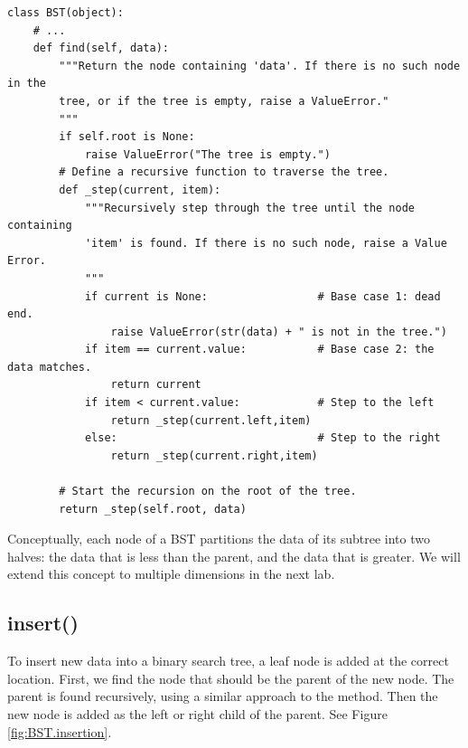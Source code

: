 \begin{lstlisting}
class BST(object):
    # ...
    def find(self, data):
        """Return the node containing 'data'. If there is no such node in the
        tree, or if the tree is empty, raise a ValueError."
        """
        if self.root is None:
            raise ValueError("The tree is empty.")
        # Define a recursive function to traverse the tree.
        def _step(current, item):
            """Recursively step through the tree until the node containing
            'item' is found. If there is no such node, raise a Value Error.
            """
            if current is None:                 # Base case 1: dead end.
                raise ValueError(str(data) + " is not in the tree.")
            if item == current.value:           # Base case 2: the data matches.
                return current
            if item < current.value:            # Step to the left
                return _step(current.left,item)
            else:                               # Step to the right
                return _step(current.right,item)
        
        # Start the recursion on the root of the tree.
        return _step(self.root, data)
\end{lstlisting}

\begin{info}
Conceptually, each node of a BST partitions the data of its subtree into two halves: the data that is less than the parent, and the data that is greater.
We will extend this concept to multiple dimensions in the next lab.
\end{info}

\subsection*{insert()}

To insert new data into a binary search tree, a leaf node is added at the correct location.
First, we find the node that should be the parent of the new node.
The parent is found recursively, using a similar approach to the  method.
Then the new node is added as the left or right child of the parent.
See Figure \ref{fig:BST.insertion}.

